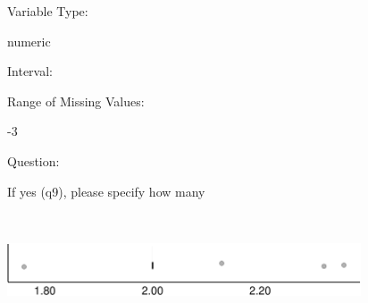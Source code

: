 \documentclass[
]{article}
\begin{document}
\begin{minipage}[t]{0.3\linewidth}

Variable Type:

\end{minipage}%
\begin{minipage}[t]{0.7\linewidth}

numeric

\end{minipage}

\begin{minipage}[t]{0.3\linewidth}

Interval:

\end{minipage}%
\begin{minipage}[t]{0.7\linewidth}

\end{minipage}

\begin{minipage}[t]{0.3\linewidth}

Range of Missing Values:

\end{minipage}%
\begin{minipage}[t]{0.7\linewidth}

-3

\end{minipage}

\begin{minipage}[t]{0.3\linewidth}

Question:

\end{minipage}%
\begin{minipage}[t]{0.7\linewidth}

If yes (q9), please specify how many

\end{minipage}

\begin{minipage}[t]{0.3\linewidth}

~

\end{minipage}%
\begin{minipage}[t]{0.7\linewidth}

\includegraphics[width=396px]{codebook_template_files/figure-latex/q9a_rainplot-1}

\end{minipage}
 \vspace*{0.5mm} 
\end{document}
